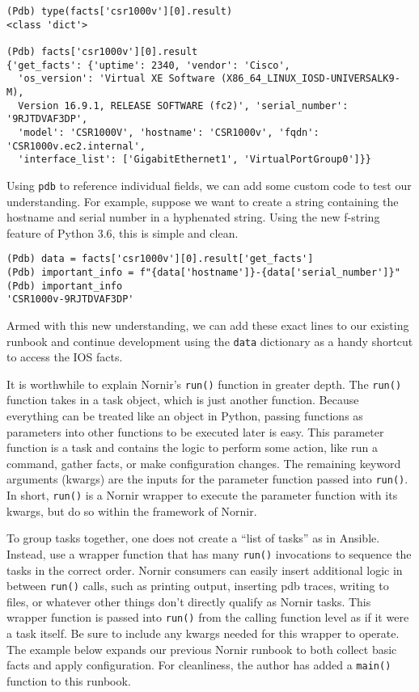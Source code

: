 \begin{verbatim}
(Pdb) type(facts['csr1000v'][0].result)
<class 'dict'>

(Pdb) facts['csr1000v'][0].result
{'get_facts': {'uptime': 2340, 'vendor': 'Cisco',
  'os_version': 'Virtual XE Software (X86_64_LINUX_IOSD-UNIVERSALK9-M),
  Version 16.9.1, RELEASE SOFTWARE (fc2)', 'serial_number': '9RJTDVAF3DP',
  'model': 'CSR1000V', 'hostname': 'CSR1000v', 'fqdn': 'CSR1000v.ec2.internal',
  'interface_list': ['GigabitEthernet1', 'VirtualPortGroup0']}}
\end{verbatim}

Using \verb|pdb| to reference individual fields, we can add some custom code
to test our understanding. For example, suppose we want to create a string
containing the hostname and serial number in a hyphenated string. Using the
new f-string feature of Python 3.6, this is simple and clean.

\begin{verbatim}
(Pdb) data = facts['csr1000v'][0].result['get_facts']
(Pdb) important_info = f"{data['hostname']}-{data['serial_number']}"
(Pdb) important_info
'CSR1000v-9RJTDVAF3DP'
\end{verbatim}

Armed with this new understanding, we can add these exact lines to our
existing runbook and continue development using the \verb|data| dictionary as
a handy shortcut to access the IOS facts.

It is worthwhile to explain Nornir's \verb|run()| function in greater depth. The
\verb|run()| function takes in a task object, which is just another function. Because
everything can be treated like an object in Python, passing functions as
parameters into other functions to be executed later is easy. This parameter
function is a task and contains the logic to perform some action, like run a
command, gather facts, or make configuration changes. The remaining keyword
arguments (kwargs) are the inputs for the parameter function passed into
\verb|run()|. In short, \verb|run()| is a Nornir wrapper to execute the
parameter function with its kwargs, but do so within the framework of Nornir.

To group tasks together, one does not create a ``list of tasks'' as in
Ansible. Instead, use a wrapper function that has many \verb|run()| invocations to
sequence the tasks in the correct order. Nornir consumers can easily insert
additional logic in between \verb|run()| calls, such as printing output, inserting
pdb traces, writing to files, or whatever other things don't directly qualify
as Nornir tasks. This wrapper function is passed into \verb|run()| from the calling
function level as if it were a task itself. Be sure to include any kwargs
needed for this wrapper to operate. The example below expands our previous
Nornir runbook to both collect basic facts and apply configuration. For
cleanliness, the author has added a \verb|main()| function to this runbook.

